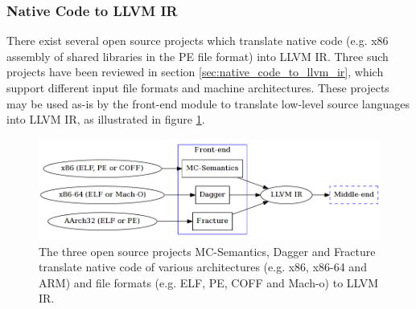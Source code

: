 
\subsubsection{Native Code to LLVM IR}
\label{sec:design_native_code_to_llvm_ir}

There exist several open source projects which translate native code (e.g. x86 assembly of shared libraries in the PE file format) into LLVM IR. Three such projects have been reviewed in section \ref{sec:native_code_to_llvm_ir}, which support different input file formats and machine architectures. These projects may be used as-is by the front-end module to translate low-level source languages into LLVM IR, as illustrated in figure \ref{fig:front-end_binary}.

\begin{figure}[htbp]
	\begin{center}
		\includegraphics[width=\textwidth]{inc/front-end_binary.png}
		\caption{The three open source projects MC-Semantics, Dagger and Fracture translate native code of various architectures (e.g. x86, x86-64 and ARM) and file formats (e.g. ELF, PE, COFF and Mach-o) to LLVM IR.}
		\label{fig:front-end_binary}
	\end{center}
\end{figure}

